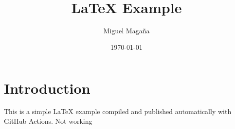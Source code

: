 \documentclass{article}
\title{LaTeX Example}
\author{Miguel Magaña}
\date{\today}
\begin{document}
\maketitle

\section{Introduction}

This is a simple \LaTeX{} example compiled and published automatically with GitHub Actions.
Not working
\end{document}
